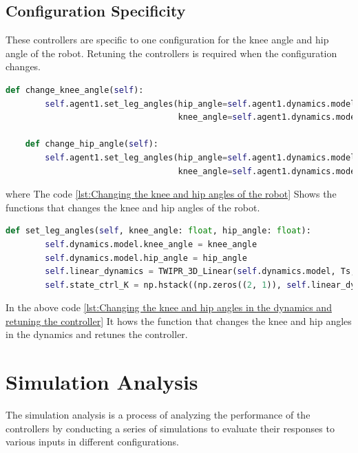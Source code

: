 \subsection{Configuration Specificity}
These controllers are specific to one configuration for the knee angle and hip angle of the robot.
Retuning the controllers is required when the configuration changes.
\begin{lstlisting}[language=Python, caption=Changing the knee and hip angles of the robot, label={lst:Changing the knee and hip angles of the robot}]
    def change_knee_angle(self):
        self.agent1.set_leg_angles(hip_angle=self.agent1.dynamics.model.hip_angle,
                                   knee_angle=self.agent1.dynamics.model.knee_angle + deg2rad(5))

    def change_hip_angle(self):
        self.agent1.set_leg_angles(hip_angle=self.agent1.dynamics.model.hip_angle + deg2rad(5),
                                   knee_angle=self.agent1.dynamics.model.knee_angle)
\end{lstlisting}
where The code \ref{lst:Changing the knee and hip angles of the robot} Shows the functions that changes the knee and hip angles of the robot.
\begin{lstlisting}[language=Python, caption=Changing the knee and hip angles in the dynamics and retuning the controller, label={lst:Changing the knee and hip angles in the dynamics and retuning the controller}]
    def set_leg_angles(self, knee_angle: float, hip_angle: float):
        self.dynamics.model.knee_angle = knee_angle
        self.dynamics.model.hip_angle = hip_angle
        self.linear_dynamics = TWIPR_3D_Linear(self.dynamics.model, Ts, self.poles, self.eigenvectors)
        self.state_ctrl_K = np.hstack((np.zeros((2, 1)), self.linear_dynamics.K))
\end{lstlisting}
In the above code \ref{lst:Changing the knee and hip angles in the dynamics and retuning the controller} It hows the function that changes the knee and hip angles in the dynamics and retunes the controller.

\newpage
\section{Simulation Analysis}
The simulation analysis is a process of analyzing the performance of the controllers by conducting a series of simulations to evaluate their responses to various inputs in different configurations.
